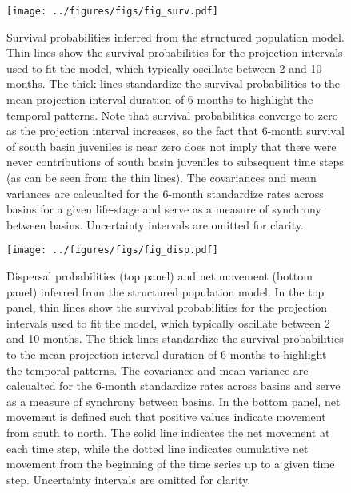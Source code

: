 \documentclass[11pt]{article}
\begin{document}
\clearpage
\begin{figure}
\centering
\texttt{[image: ../figures/figs/fig\_surv.pdf]}
\caption{\label{fig:surv}
Survival probabilities inferred from the structured population model.
Thin lines show the survival probabilities for the projection intervals
used to fit the model, 
which typically oscillate between 2 and 10 months.
The thick lines standardize the survival probabilities to the mean 
projection interval duration of 6 months to highlight the temporal patterns.
Note that survival probabilities converge to zero as the projection interval increases,
so the fact that 6-month survival of south basin juveniles is near zero does not 
imply that there were never contributions of south basin juveniles to subsequent time steps
(as can be seen from the thin lines).
The covariances and mean variances are calcualted 
for the 6-month standardize rates
across basins for a given life-stage
and serve as a measure of synchrony between basins.
Uncertainty intervals are omitted for clarity.
}
\end{figure}
\clearpage

\clearpage
\begin{figure}
\centering
\texttt{[image: ../figures/figs/fig\_disp.pdf]}
\caption{\label{fig:disp}
Dispersal probabilities (top panel) and net movement (bottom panel)
inferred from the structured population model.
In the top panel,
thin lines show the survival probabilities for the projection intervals
used to fit the model, 
which typically oscillate between 2 and 10 months.
The thick lines standardize the survival probabilities to the mean 
projection interval duration of 6 months to highlight the temporal patterns.
The covariance and mean variance are calcualted 
for the 6-month standardize rates
across basins
and serve as a measure of synchrony between basins.
In the bottom panel,
net movement is defined such that positive values indicate movement from
south to north.
The solid line indicates the net movement at each time step,
while the dotted line indicates cumulative net movement from the 
beginning of the time series up to a given time step.
Uncertainty intervals are omitted for clarity.
}
\end{figure}
\clearpage
\end{document}
